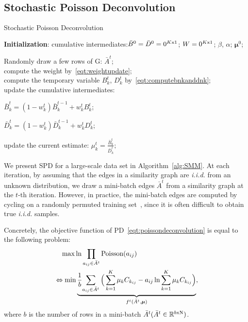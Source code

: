 \documentclass[runningheads]{llncs}
\begin{document}
\subsection{Stochastic Poisson Deconvolution}
\begin{algorithm}
\small
{
    \SetAlgoLined
    \caption{Stochastic Poisson Deconvolution}
    \label{alg:SMM}
    \textbf{Initialization}: cumulative intermediates:$\bar{B}^0=\bar{D}^0=0^{K\rm x 1}$; $W=0^{K\rm x 1}$; $\beta$, $\alpha$; $\bm{\mu}^0$;\\
     {
        Randomly draw a few rows of G: $\bar{A}^t$;\\
        compute the weight by~\eqref{eqt:weightupdate};\\
        compute the temporary variable $B^t_k$, $D^t_k$ by~\eqref{eqt:computebnkanddnk};\\
        update the cumulative intermediates:
            \begin{center}$\bar{B}^t_k = (1-w^t_k)\bar{B}^{t-1}_k + w^t_kB^t_k$;\end{center}
            \begin{center}$\bar{D}^t_k = (1-w^t_k)\bar{D}^{t-1}_k + w^t_kD^t_k$;\end{center}
        update the current estimate: $\mu^t_k = \frac{\bar{B}^t_k}{\bar{D}^t_k};$
    }
    \KwOut{$\bm{\mu}$;}
}
\end{algorithm}

We present SPD for a large-scale data set in Algorithm~\ref{alg:SMM}. At each iteration, by assuming that the edges in a similarity graph are \emph{i.i.d.} from an unknown distribution, we draw a mini-batch edges $\bar{A}^t$ from a similarity graph at the $t$-th iteration. However, in practice, the mini-batch edges are computed by cycling on a randomly permuted training set~\cite{bottou-2007-tradeoffs}, since it is often difficult to obtain true \emph{i.i.d.} samples.

Concretely, the objective function of PD~\eqref{eqt:poissondeconvolution} is equal to the following problem:
\begin{align} \label{eq:objectivefunction}
    &\quad\max{\ln \prod_{a_{ij} \in \bar{A}^t}\text{Poisson}(a_{ij})}  \notag\\
  &\Leftrightarrow\min \underbrace{\frac{1}{b}{\sum_{a_{ij} \in \bar{A}^t} \Big(\sum_{k=1}^{K}\mu_k C_{k_{ij}} - a_{ij}\ln \sum_{k=1}^{K}\mu_k C_{k_{ij}}\Big)}}_{f^t(\bar{A}^t,\bm{\mu})},
\end{align}
where $b$ is the number of rows in a mini-batch $\bar{A}^t(\bar{A}^t\in \mathbb{R}^{b \rm x N})$.
\end{document}
